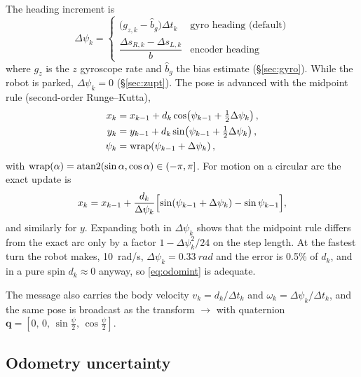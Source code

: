 The heading increment is
\begin{equation}\label{eq:dpsi}
\Delta\psi_k = \begin{cases}
\bigl(g_{z,k}-\hat b_g\bigr)\Delta t_k & \text{gyro heading (default)}\\[2pt]
\dfrac{\Delta s_{R,k}-\Delta s_{L,k}}{b} & \text{encoder heading}
\end{cases}
\end{equation}
where $g_z$ is the $z$ gyroscope rate and $\hat b_g$ the bias estimate
(\S\ref{sec:gyro}). While the robot is parked, $\Delta\psi_k=0$
(\S\ref{sec:zupt}). The pose is advanced with the midpoint rule
(second-order Runge--Kutta),
\begin{equation}\label{eq:odomint}
\begin{aligned}
x_{k} &= x_{k-1} + d_k\cos\!\left(\psi_{k-1}+\tfrac12\Delta\psi_k\right),\\
y_{k} &= y_{k-1} + d_k\sin\!\left(\psi_{k-1}+\tfrac12\Delta\psi_k\right),\\
\psi_{k} &= \operatorname{wrap}\!\left(\psi_{k-1}+\Delta\psi_k\right),
\end{aligned}
\end{equation}
with $\operatorname{wrap}(\alpha)=\operatorname{atan2}(\sin\alpha,\cos\alpha)\in(-\pi,\pi]$.
For motion on a circular arc the exact update is
\begin{equation}
x_k = x_{k-1}+\frac{d_k}{\Delta\psi_k}\Bigl[\sin(\psi_{k-1}+\Delta\psi_k)-\sin\psi_{k-1}\Bigr],
\end{equation}
and similarly for $y$. Expanding both in $\Delta\psi_k$ shows that the
midpoint rule differs from the exact arc only by a factor
$1-\Delta\psi_k^2/24$ on the step length. At the fastest turn the robot makes,
\SI{10}{rad/s}, $\Delta\psi_k=\SI{0.33}{rad}$ and the error is 0.5\% of
$d_k$, and in a pure spin $d_k\approx0$ anyway, so \eqref{eq:odomint} is
adequate.

The message also carries the body velocity $v_k=d_k/\Delta t_k$ and
$\omega_k=\Delta\psi_k/\Delta t_k$, and the same pose is broadcast as the
transform $\to$ with quaternion
$\bm{q}=[0,\,0,\,\sin\frac{\psi}{2},\,\cos\frac{\psi}{2}]$.

\subsection{Odometry uncertainty}

